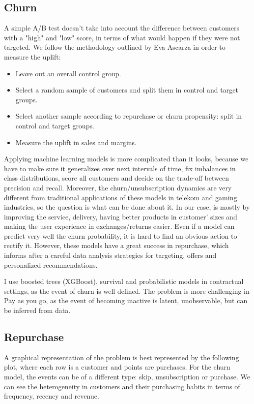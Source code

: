 \documentclass[12pt]{article}
\begin{document}
\subsection{Churn}


A simple A/B test doesn't take into account the difference between customers with a "high" and "low" score, in terms of what would happen if they were not targeted. We follow the methodology outlined by Eva Ascarza in order to measure the uplift:

\begin{itemize}
	\item Leave out an overall control group.
	\item Select a random sample of customers and split them in control and target groups.
	\item Select another sample according to repurchase or churn propensity: split in control and target groups.
	\item Measure the uplift in sales and margins.
\end{itemize}

Applying machine learning models is more complicated than it looks, because we have to make sure it generalizes over next intervals of time, fix imbalances in class distributions, score all customers and decide on the trade-off between precision and recall. Moreover, the churn/unsubscription dynamics are very different from traditional applications of these models in telekom and gaming industries, so the question is what can be done about it. In our case, is mostly by improving the service, delivery, having better products in customer' sizes and making the user experience in exchanges/returns easier. Even if a model can predict very well the churn probability, it is hard to find an obvious action to rectify it. However, these models have a great success in repurchase, which informs after a careful data analysis strategies for targeting, offers and personalized recommendations.

I use boosted trees (XGBoost), survival and probabilistic models in contractual settings, as the event of churn is well defined. The problem is more challenging in Pay as you go, as the event of becoming inactive is latent, unobservable, but can be inferred from data.

\subsection{Repurchase}

A graphical representation of the problem is best represented by the following plot, where each row is a customer and points are purchases. For the churn model, the events can be of a different type: skip, unsubscription or purchase. We can see the heterogeneity in customers and their purchasing habits in terms of frequency, recency and revenue.  
\end{document}
